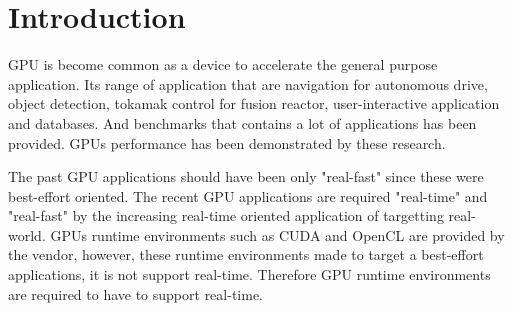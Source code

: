 \section{Introduction}
GPU is become common as a device to accelerate the general purpose application.
Its range of application that are navigation\cite{cmu:routing} for autonomous drive, object detection\cite{hirabayashi:cpsna2013},
tokamak control for fusion reactor\cite{tokamak},
user-interactive application\cite{kato:rtas2011} and  databases\cite{bakkum:sql}.
And benchmarks\cite{rodinia} that contains a lot of applications has been provided.
GPUs performance has been demonstrated by these research.

The past GPU applications should have been only "real-fast" since these were best-effort oriented.
The recent GPU applications are required "real-time" and "real-fast" by the increasing real-time oriented application of targetting real-world.
GPUs runtime environments such as CUDA\cite{nvidia:cuda_zone} and OpenCL\cite{opencl} are provided by the vendor,
however, these runtime environments made to target a best-effort applications, it is not support real-time.
Therefore GPU runtime environments are required to have to support real-time.

